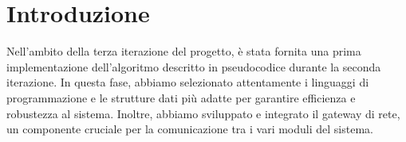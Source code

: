 \section{Introduzione}
Nell'ambito della terza iterazione del progetto, è stata fornita una prima implementazione dell'algoritmo descritto in pseudocodice durante la seconda iterazione. In questa fase, abbiamo selezionato attentamente i linguaggi di programmazione e le strutture dati più adatte per garantire efficienza e robustezza al sistema. Inoltre, abbiamo sviluppato e integrato il gateway di rete, un componente cruciale per la comunicazione tra i vari moduli del sistema.
\clearpage